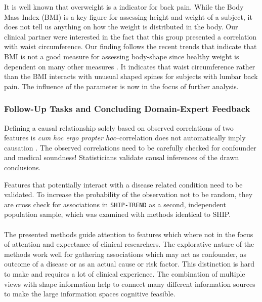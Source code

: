 \documentclass[journal]{style/vgtc} 			          %
\begin{document}
It is well known that overweight is a indicator for back pain.
%
While the Body Mass Index (BMI) is a key figure for assessing height and weight of a subject, it does not tell us anything on how the weight is distributed in the body.
%
Our clinical partner were interested in the fact that this group presented a correlation with waist circumference.
%
Our finding follows the recent trends that indicate that BMI is not a good measure for assessing body-shape since healthy weight is dependent on many other measures \cite{Ahima2013}.
%
It indicates that waist circumference rather than the BMI interacts with unusual shaped spines for subjects with lumbar back pain.
%
The influence of the parameter is now in the focus of further analysis.

\subsubsection{Follow-Up Tasks and Concluding Domain-Expert Feedback}
Defining a causal relationship solely based on observed correlations of two features is \emph{cum hoc ergo propter hoc}--correlation does not automatically imply causation \cite{Tufte2003}.
%
The observed correlations need to be carefully checked for confounder and medical soundness!
%
Statisticians validate causal inferences of the drawn conclusions.

Features that potentially interact with a disease related condition need to be validated.
%
To increase the probability of the observation not to be random, they are cross check for associations in \texttt{SHIP-TREND} as a second, independent population sample, which was examined with methods identical to SHIP.
%
\\\\
The presented methods guide attention to features which where not in the focus of attention and expectance of clinical researchers.
%
The explorative nature of the methods work well for gathering associations which may act as confounder, as outcome of a disease or as an actual cause or risk factor.
%
This distinction is hard to make and requires a lot of clinical experience.
%
The combination of multiple views with shape information help to connect many different information sources to make the large information spaces cognitive feasible.
%
\end{document}
